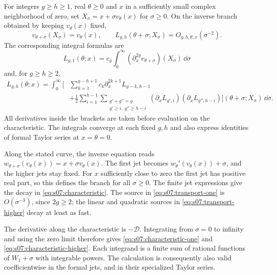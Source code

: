 \begin{crl}\label{crl:s07:characteristic-recovery}
For integers $g\geq h\geq1$, real $\theta\geq0$ and $x$ in a sufficiently small complex
neighborhood of zero, set
$X_\sigma=x+\sigma v_\theta(x)$ for $\sigma\geq0$.
On the inverse branch obtained by keeping $v_\theta(x)$ fixed,
\begin{equation}\label{eq:s07:characteristic}
 v_{\theta+\sigma}(X_\sigma)=v_\theta(x),\qquad
 L_{g,h}(\theta+\sigma;X_\sigma)=O_{g,h,\theta,x}(\sigma^{-2}).
\end{equation}
The corresponding integral formulas are
\begin{equation}\label{eq:s07:characteristic-one}
 L_{g,1}(\theta;x)
 =c_g\int_0^\infty
       (\partial_x^{2g}v_{\theta+\sigma})(X_\sigma)\,\dd\sigma
\end{equation}
and, for $g\geq h\geq2$,
\begin{equation}\label{eq:s07:characteristic-higher}
 \begin{aligned}
 L_{g,h}(\theta;x)=\int_0^\infty
 \Biggl[&\sum_{k=1}^{g-h+1}c_k\partial_x^{2k+1}L_{g-k,h-1}\\
 &+\frac12\sum_{i=1}^{h-1}
   \sum_{\substack{g'+g''=g\\g'\geq i,\ g''\geq h-i}}
     (\partial_xL_{g',i})(\partial_xL_{g'',h-i})
 \Biggr](\theta+\sigma;X_\sigma)\,\dd\sigma.
 \end{aligned}
\end{equation}
All derivatives inside the brackets are taken before evaluation on
the characteristic. The integrals converge at each fixed $g,h$ and
also express identities of formal Taylor series at $x=\theta=0$.
\end{crl}
\begin{prf}
Along the stated curve, the inverse equation reads
$w_{\theta+\sigma}(v_\theta(x))=x+\sigma v_\theta(x)$.
The first jet becomes $w_\theta'(v_\theta(x))+\sigma$, and the
higher jets stay fixed. For $x$ sufficiently close to zero the
first jet has positive real part, so this defines the branch for
all $\sigma\geq0$. The finite jet expressions give the decay in
\eqref{eq:s07:characteristic}. The source in
\eqref{eq:s07:transport-one} is $O(\sigma^{-3})$, since
$2g\geq2$; the linear and quadratic sources in
\eqref{eq:s07:transport-higher} decay at least as fast.

The derivative along the characteristic is $-\mathscr D$.
Integrating from $\sigma=0$ to infinity and using the zero limit
therefore gives \eqref{eq:s07:characteristic-one} and
\eqref{eq:s07:characteristic-higher}. Each integrand is a finite
sum of rational functions of $W_1+\sigma$ with integrable powers.
The calculation is consequently also valid coefficientwise in the
formal jets, and in their specialized Taylor series.
\end{prf}

